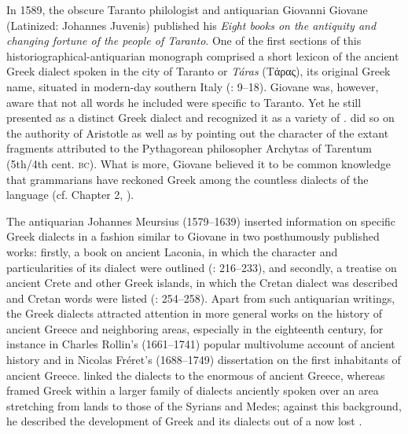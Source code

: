 In 1589, the obscure Taranto philologist and antiquarian Giovanni Giovane (Latinized: Johannes Juvenis) published his \textit{Eight books on the antiquity and changing fortune of the people of Taranto}. One of the first sections of this historiographical-antiquarian monograph comprised a short lexicon of the ancient Greek dialect spoken in the city of Taranto or \textit{Táras} (Tάρας), its original Greek name, situated in modern-day southern Italy (\citealt{Giovane1589}: 9–18). Giovane was, however, aware that not all words he included were specific to Taranto. Yet he still presented  as a distinct Greek dialect and recognized it as a variety of . \citet[8--9]{Giovane1589} did so on the authority of Aristotle as well as by pointing out the  character of the extant fragments attributed to the Pythagorean philosopher Archytas of Tarentum (5th/4th cent. \textsc{bc}). What is more, Giovane believed it to be common knowledge that grammarians have reckoned  Greek among the countless dialects of the language (cf. Chapter 2, ).

The  antiquarian Johannes Meursius (1579–1639) inserted information on specific Greek dialects in a fashion similar to Giovane in two posthumously published works: firstly, a book on ancient Laconia, in which the  character and particularities of its dialect were outlined (\citealt{Meursius1661}: 216–233), and secondly, a treatise on ancient Crete and other Greek islands, in which the  Cretan dialect was described and Cretan words were listed (\citealt{Meursius1675}: 254–258). Apart from such antiquarian writings, the Greek dialects attracted attention in more general works on the history of ancient Greece and neighboring areas, especially in the eighteenth century, for instance in Charles Rollin’s (1661–1741) popular multivolume account of ancient history and in Nicolas Fréret’s (1688–1749) dissertation on the first inhabitants of ancient Greece. \citet[395--396]{Rollin1731} linked the dialects to the enormous  of ancient Greece, whereas \citet[esp. 107--129]{Freret1809} framed Greek within a larger family of dialects anciently spoken over an area stretching from  lands to those of the Syrians and Medes; against this background, he described the development of Greek and its dialects out of a now lost .

